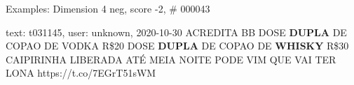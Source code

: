 \begin{frame}{Examples: Dimension 4 neg, score -2, \# 000043}
\footnotesize
\begin{alertblock}{text: t031145, user: unknown, 2020-10-30}
ACREDITA BB DOSE \textbf{DUPLA} DE COPAO DE VODKA R\$20 DOSE \textbf{DUPLA} DE 
COPAO DE \textbf{WHISKY} R\$30 CAIPIRINHA LIBERADA ATÉ MEIA NOITE 
   
 PODE VIM QUE VAI TER LONA  
    
    
    
    
  https://t.co/7EGrT51sWM 
\end{alertblock}
\end{frame}
